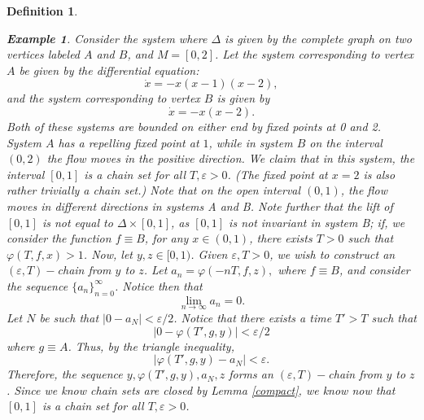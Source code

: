 \documentclass[11pt]{article}
\newtheorem{defn}[thm]{Definition}
\newtheorem{ex}[thm]{Example}
\begin{document}
\begin{defn}
\begin{ex}
Consider the system where $\Delta$ is given by the complete graph on two vertices labeled $A$ and $B$, and $M=[0,2]$.  Let the system corresponding to vertex $A$ be given by the differential equation:
$$\dot{x}=-x(x-1)(x-2),$$
and the system corresponding to vertex $B$ is given by 
$$\dot{x}=-x(x-2).$$
Both of these systems are bounded on either end by fixed points at 0 and 2.  System $A$ has a repelling fixed point at $1$, while in system $B$ on the interval $(0,2)$ the flow moves in the positive direction.  We claim that in this system, the interval $[0,1]$ is a chain set for all $T, \varepsilon>0$.  (The fixed point at $x=2$ is also rather trivially a chain set.) Note that on the open interval $(0,1)$, the flow moves in different directions in systems A and B.  Note further that the lift of $[0,1]$ is not equal to $\Delta\times [0,1]$, as $[0,1]$ is not invariant in system B; if, we consider the function $f\equiv B$, for any $x\in (0,1)$, there exists $T>0$ such that $\varphi(T,f,x)>1$.  Now, let $y,z\in [0,1)$.  Given $\varepsilon,T>0$, we wish to construct an $(\varepsilon,T)-$chain from $y$ to $z$.  Let $a_n=\varphi(-nT,f,z),$ where $f\equiv B$, and consider the sequence $\{a_n\}_{n=0}^\infty$. Notice then that 
$$\lim_{n\rightarrow\infty}a_n=0.$$
Let $N$ be such that $|0-a_N|<\varepsilon/2$. Notice that there exists a time $T'>T$ such that $$|0-\varphi(T',g,y)|<\varepsilon/2$$
where $g\equiv A$. Thus, by the triangle inequality, 
$$|\varphi(T',g,y)-a_N|<\varepsilon.$$
Therefore, the sequence $y, \varphi(T',g,y),a_N,z$ forms an $(\varepsilon,T)-$chain from $y$ to $z$.  Since we know chain sets are closed by Lemma \ref{compact}, we know now that $[0,1]$ is a chain set for all $T,\varepsilon>0$. \\

\end{ex}
\end{defn}
\end{document}
